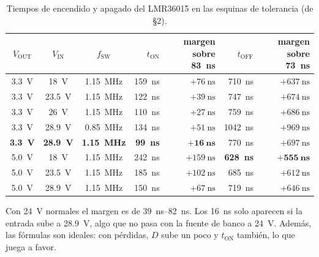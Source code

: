 \begin{table}[htbp]
\centering
\caption{Tiempos de encendido y apagado del LMR36015 en las esquinas de tolerancia (de  §2).}\label{tab:c10-ton}
\small
\begin{tabular}{@{}cccrrrr@{}}
\toprule
$V_\text{OUT}$ & $V_\text{IN}$ & $f_\text{SW}$ & $t_\text{ON}$ & margen sobre \SI{83}{\nano\second} & $t_\text{OFF}$ & margen sobre \SI{73}{\nano\second}\\\midrule
\SI{3.3}{\volt} & \SI{18}{\volt} & \SI{1.15}{\mega\hertz} & \SI{159}{\nano\second} & $+\SI{76}{\nano\second}$ & \SI{710}{\nano\second} & $+\SI{637}{\nano\second}$\\
\SI{3.3}{\volt} & \SI{23.5}{\volt} & \SI{1.15}{\mega\hertz} & \SI{122}{\nano\second} & $+\SI{39}{\nano\second}$ & \SI{747}{\nano\second} & $+\SI{674}{\nano\second}$\\
\SI{3.3}{\volt} & \SI{26}{\volt} & \SI{1.15}{\mega\hertz} & \SI{110}{\nano\second} & $+\SI{27}{\nano\second}$ & \SI{759}{\nano\second} & $+\SI{686}{\nano\second}$\\
\SI{3.3}{\volt} & \SI{28.9}{\volt} & \SI{0.85}{\mega\hertz} & \SI{134}{\nano\second} & $+\SI{51}{\nano\second}$ & \SI{1042}{\nano\second} & $+\SI{969}{\nano\second}$\\
\textbf{\SI{3.3}{\volt}} & \textbf{\SI{28.9}{\volt}} & \textbf{\SI{1.15}{\mega\hertz}} & \textbf{\SI{99}{\nano\second}} & $\mathbf{+\SI{16}{\nano\second}}$ & \SI{770}{\nano\second} & $+\SI{697}{\nano\second}$\\
\SI{5.0}{\volt} & \SI{18}{\volt} & \SI{1.15}{\mega\hertz} & \SI{242}{\nano\second} & $+\SI{159}{\nano\second}$ & \textbf{\SI{628}{\nano\second}} & $\mathbf{+\SI{555}{\nano\second}}$\\
\SI{5.0}{\volt} & \SI{23.5}{\volt} & \SI{1.15}{\mega\hertz} & \SI{185}{\nano\second} & $+\SI{102}{\nano\second}$ & \SI{685}{\nano\second} & $+\SI{612}{\nano\second}$\\
\SI{5.0}{\volt} & \SI{28.9}{\volt} & \SI{1.15}{\mega\hertz} & \SI{150}{\nano\second} & $+\SI{67}{\nano\second}$ & \SI{719}{\nano\second} & $+\SI{646}{\nano\second}$\\
\bottomrule
\end{tabular}
\end{table}

\begin{ojo}
Con \SI{24}{\volt} normales el margen es de \SIrange{39}{82}{\nano\second}. Los \SI{16}{\nano\second} solo aparecen si
la entrada sube a \SI{28.9}{\volt}, algo que no pasa con la fuente de banco a \SI{24}{\volt}. Además, las fórmulas
son ideales: con pérdidas, $D$ sube un poco y $t_\text{ON}$ también, lo que juega a favor.
\end{ojo}

